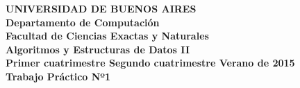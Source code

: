 
\def\Materia{Algoritmos y Estructuras de Datos II}
\def\cuatrimestre{1}
\def\elanio{2015}
\def\Titulo{\LARGE Trabajo Práctico Nº1}
\def\Fecha{}

\newcommand{\cuatrimestreLindo}{
  \ifthenelse{\equal{\cuatrimestre}{1}}
  {Primer cuatrimestre}
  {\ifthenelse{\equal{\cuatrimestre}{2}}
  {Segundo cuatrimestre}
  {Verano}}
}


\thispagestyle{empty}


\vspace{5mm}

\begin{center}
  {\textbf{\large UNIVERSIDAD DE BUENOS AIRES}}\\[1.5em]
  {\textbf{\large Departamento de Computaci\'{o}n}}\\[1.5em]
    {\textbf{\large Facultad de Ciencias Exactas y Naturales}}\\
    \vspace{20mm}
    {\LARGE\textbf{\Materia}}\\[1em]    
    \vspace{5mm}
    {\LARGE\textbf{\cuatrimestreLindo de \elanio}}\\
    \vspace{15mm}
    {\Large \textbf{\Titulo}}\\[1em]
    \vspace{15mm}
    {\textbf{\Large \Fecha}}\\
    \vspace{15mm}
    \textbf{\tablaints}
\end{center}

